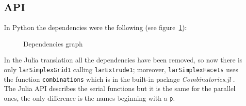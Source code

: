 \documentclass[a4paper,12pt,titlepage]{article}					%
\begin{document}
\subsection{API}
In Python the dependencies were the following (see figure~\ref{fig:dependenciesGraph}):

\begin{figure}[h]
\centering
{} \quad
{}
\caption{Dependencies graph}
\label{fig:dependenciesGraph}
\end{figure}

In the Julia translation all the dependencies have been removed, so now there is only \texttt{larSimplexGrid1} calling \texttt{larExtrude1}; moreover, \texttt{larSimplexFacets} uses the function \texttt{combinations} which is in the built-in package \emph{Combinatorics.jl} .\\

The Julia API describes the serial functions but it is the same for the parallel ones, the only difference is the names beginning with a \texttt{p}.\\
\end{document}
